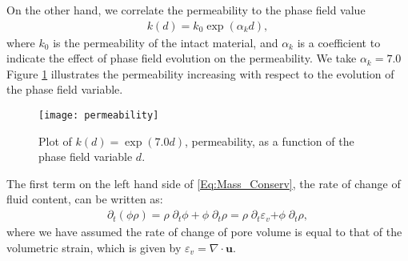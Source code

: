 On the other hand, we correlate the permeability to the phase field value 
\begin{equation}\label{Eq:k_0}
\begin{aligned}
k(d) = k_0\exp{\left({\alpha}_k d\right)},
\end{aligned}
\end{equation}
where $k_0$ is the permeability of the intact material, and ${\alpha}_k$ is a coefficient to indicate the effect of phase field evolution on the permeability. We take ${\alpha}_k=7.0$ %
Figure \ref{Fig:Permeability_increments} illustrates the permeability increasing with respect to the evolution of the phase field variable. 


\begin{figure}[htbp]
	\centering
	\texttt{[image: permeability]}
	\caption{Plot of $k(d)=\exp(7.0 d)$, permeability, as a function of the phase field variable $d$.}
	\label{Fig:Permeability_increments}
\end{figure}

The first term on the left hand side of \eqref{Eq:Mass_Conserv}, the rate of change of fluid content, can be written as:
\begin{equation}\label{Eq:diff_m}
\begin{aligned}
\partial_t\left(\phi\rho\right) = \rho \; \partial_t \phi +\phi \; \partial_t \rho  = \rho \;  \partial_t \varepsilon_v{+\phi \; \partial_t \rho},
\end{aligned}
\end{equation}
where we have assumed the rate of change of pore volume is equal to that of the volumetric strain, which is given by $\varepsilon_v= \nabla \cdot \bm{u}$. 

